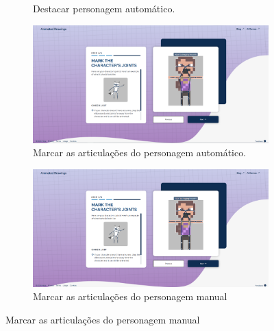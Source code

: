 \begin{figure}[htbp]
\begin{subfigure}{0.6\linewidth}
        \caption{\small Destacar personagem automático.}
        \label{fig:sketch3c}
    \end{subfigure}
    \begin{subfigure}{0.45\linewidth}
        \centering
        \includegraphics[width=1\linewidth]{figs/sketchLab/3tela4.PNG}
        \caption{\small Marcar as articulações do personagem automático.}
        \label{fig:sketch3d}
    \end{subfigure}
    \begin{subfigure}{0.45\linewidth}
        \centering
        \includegraphics[width=1\linewidth]{figs/sketchLab/3tela6.PNG}
        \caption{\small  Marcar as articulações do personagem manual}
        \label{fig:sketch3e}
    \end{subfigure}
\end{figure}